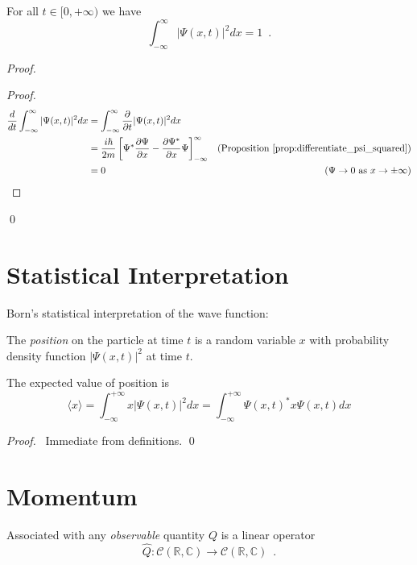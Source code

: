 \begin{prop}
For all $t \in [0, + \infty)$ we have
\[ \int_{- \infty}^\infty |\Psi(x,t)|^2 dx = 1 \enspace . \]
\end{prop}

\begin{proof}
\pf
{}
\begin{proof}
\pf
\begin{align*}
\frac{d}{dt} \int_{-\infty}^\infty |\Psi(x,t)|^2 dx
& = \int_{-\infty}^\infty \frac{\partial}{\partial t} |\Psi(x,t)|^2 dx \\
& = \frac{i \hbar}{2m} \left[ \Psi^* \frac{\partial \Psi}{\partial x} - \frac{\partial \Psi^*}{\partial x} \Psi \right]_{- \infty}^\infty & (\text{Proposition \ref{prop:differentiate_psi_squared}}) \\
& = 0 & (\Psi \rightarrow 0 \text{ as } x \rightarrow \pm \infty)
\end{align*}
\end{proof}
\qed
\end{proof}

\section{Statistical Interpretation}

Born's statistical interpretation of the wave function:

The \emph{position} on the particle at time $t$ is a random variable $x$ with probability density function $|\Psi(x,t)|^2$ at time $t$.

\begin{prop}
The expected value of position is
\[ \langle x \rangle = \int_{- \infty}^{+ \infty} x |\Psi(x,t)|^2 dx = \int_{-\infty}^{+ \infty} \Psi(x,t)^* x \Psi(x,t) dx \]
\end{prop}

\begin{proof}
\pf\ Immediate from definitions. \qed
\end{proof}

\section{Momentum}

Associated with any \emph{observable} quantity $Q$ is a linear operator
\[ \hat{Q} : \mathcal{C}(\mathbb{R}, \mathbb{C}) \rightarrow \mathcal{C}(\mathbb{R}, \mathbb{C}) \enspace .\]

